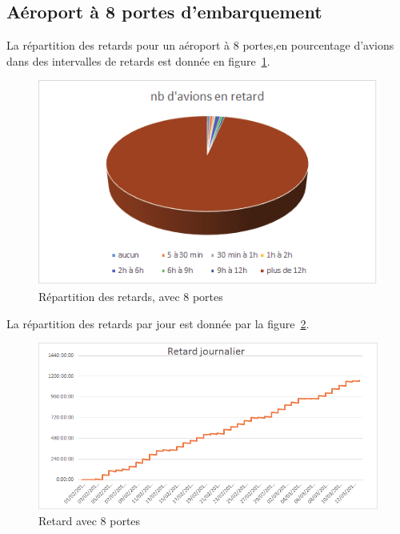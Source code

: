  \subsection{Aéroport à 8 portes d'embarquement}
La répartition des retards pour un aéroport à 8 portes,en pourcentage d'avions dans des intervalles de retards est donnée en figure~\ref{retard_camenbert_8}.
  \graphicspath{{donnees/graph_90jours/8portes/}}
\begin{figure}[H]
\centering \includegraphics[scale=0.6]{retard_avions.png}
 \caption{\label{retard_camenbert_8} Répartition des retards, avec 8 portes} 
\end{figure}
 
La répartition des retards par jour est donnée par la figure~\ref{retard_jour_8}.
\begin{figure}[H]
\centering \includegraphics[scale=0.6]{retard_jour.png}
 \caption{\label{retard_jour_8} Retard avec 8 portes} 
\end{figure}
 
